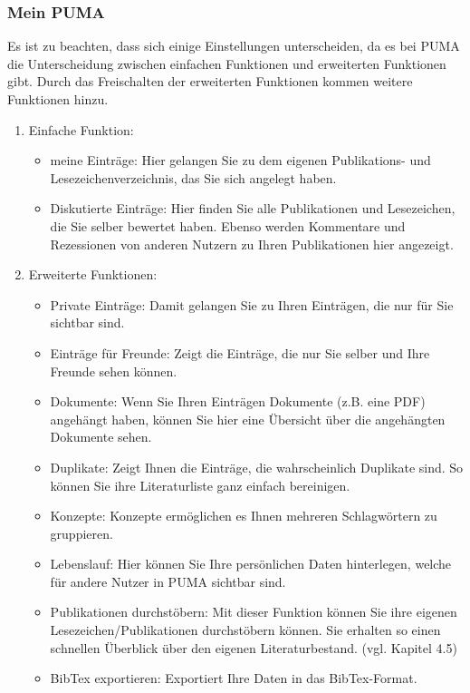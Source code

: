 \documentclass[a4paper,11pt,twoside]{scrbook}
\begin{document}
\subsubsection{Mein PUMA}
Es ist zu beachten, dass sich einige Einstellungen unterscheiden, da es bei PUMA die Unterscheidung zwischen einfachen Funktionen und erweiterten Funktionen gibt. Durch das Freischalten der erweiterten Funktionen kommen weitere Funktionen hinzu.
\begin{enumerate}
    \item Einfache Funktion:
    \begin{itemize}
        \item meine Einträge: Hier gelangen Sie zu dem eigenen Publikations- und Lesezeichenverzeichnis, das Sie sich angelegt haben.
        \item Diskutierte Einträge: Hier finden Sie alle Publikationen und Lesezeichen, die Sie selber bewertet haben. Ebenso werden Kommentare und Rezessionen von anderen Nutzern zu Ihren Publikationen hier angezeigt.
    \end{itemize}
    \item Erweiterte Funktionen:
    \begin{itemize}
        \item Private Einträge: Damit gelangen Sie zu Ihren Einträgen, die nur für Sie sichtbar sind. 
        \item Einträge für Freunde: Zeigt die Einträge, die nur Sie selber und Ihre Freunde sehen können.
        \item Dokumente: Wenn Sie Ihren Einträgen Dokumente (z.B. eine PDF) angehängt haben, können Sie hier eine Übersicht über die angehängten Dokumente sehen.
        \item Duplikate: Zeigt Ihnen die Einträge, die wahrscheinlich Duplikate sind. So können Sie ihre Literaturliste ganz einfach bereinigen. 
        \item Konzepte: Konzepte ermöglichen es Ihnen mehreren Schlagwörtern zu gruppieren. %
        \item Lebenslauf: Hier können Sie Ihre persönlichen Daten hinterlegen, welche für andere Nutzer in PUMA sichtbar sind.
        \item Publikationen durchstöbern: Mit dieser Funktion können Sie ihre eigenen Lesezeichen/Publikationen durchstöbern können. Sie erhalten so einen schnellen Überblick über den eigenen Literaturbestand. (vgl. Kapitel 4.5)
        \item BibTex exportieren: Exportiert Ihre Daten in das BibTex-Format.
    \end{itemize}
\end{enumerate}
\end{document}
